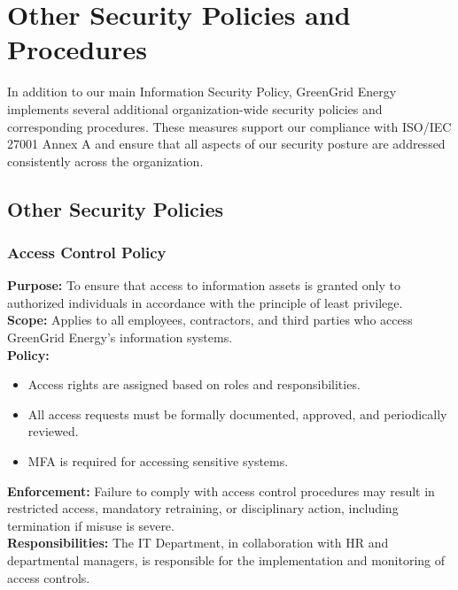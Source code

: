 \chapter{Other Security Policies and Procedures}
\label{chap:other_sec_policies}

In addition to our main Information Security Policy, GreenGrid Energy implements several 
additional organization-wide security policies and corresponding procedures. These measures 
support our compliance with ISO/IEC 27001 Annex A and ensure that all aspects of our security 
posture are addressed consistently across the organization.

\section{Other Security Policies}

\subsection{Access Control Policy}
\textbf{Purpose:} To ensure that access to information assets is granted only to authorized 
individuals in accordance with the principle of least privilege.\\[1mm]
\textbf{Scope:} Applies to all employees, contractors, and third parties who access GreenGrid 
Energy's information systems.\\[1mm]
\textbf{Policy:}
\begin{itemize}
    \item Access rights are assigned based on roles and responsibilities.
    \item All access requests must be formally documented, approved, and periodically reviewed.
    \item \ac{MFA} is required for accessing sensitive systems.
\end{itemize}
\textbf{Enforcement:} Failure to comply with access control procedures may result in restricted 
access, mandatory retraining, or disciplinary action, including termination if misuse is severe.\\[1mm]
\textbf{Responsibilities:} The \ac{IT} Department, in collaboration with \ac{HR} and departmental managers, 
is responsible for the implementation and monitoring of access controls.

